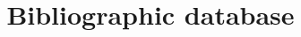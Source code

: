 \documentclass[a4paper,twoside]{article}
\begin{document}
\title{Bibliographic database}
\nocite{*}
\printbibliography
\end{document}
